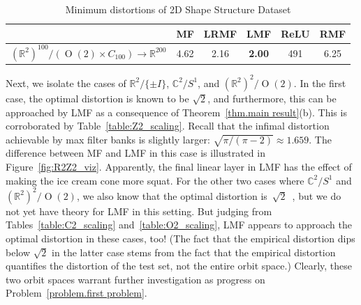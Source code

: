 \documentclass{article}
\theoremstyle{plain}
\theoremstyle{definition}
\begin{document}
{\begin{table}[p]
    \caption{Minimum distortions of 2D Shape Structure Dataset}
    \label{table:shapes_dist}
    \vspace{-6pt}
    \centering
    \begin{tabular}{|l||c|c|c|c||c|}
        \hline
        & \textbf{MF} & \textbf{LRMF} & \textbf{LMF} & \textbf{ReLU} & \textbf{RMF} \\
        \hline
        \textbf{$(\mathbb{R}^{2})^{100}/(\operatorname{O}(2) \times C_{100}) \to \mathbb{R}^{200}$} 
        & 4.62 & 2.16 & \textbf{2.00} & 491 & 6.25 \\
        \hline
    \end{tabular}
\end{table}

Next, we isolate the cases of $\mathbb{R}^2/\{\pm I\}$, $\mathbb{C}^2/S^1$, and $(\mathbb{R}^2)^2/\operatorname{O}(2)$.
In the first case, the optimal distortion is known to be $\sqrt{2}$, and furthermore, this can be approached by LMF as a consequence of Theorem~\ref{thm.main result}(b).
This is corroborated by Table~\ref{table:Z2_scaling}.
Recall that the infimal distortion achievable by max filter banks is slightly larger: $\sqrt{\pi/(\pi-2)}\approx 1.659$.
The difference between MF and LMF in this case is illustrated in Figure~\ref{fig:R2Z2_viz}.
Apparently, the final linear layer in LMF has the effect of making the ice cream cone more squat.
For the other two cases where $\mathbb{C}^2/S^1$ and $(\mathbb{R}^2)^2/\operatorname{O}(2)$, we also know that the optimal distortion is~$\sqrt{2}$~\cite{CahillIM:24,Blum-SmitEtal:25}, but we do not yet have theory for LMF in this setting.
But judging from Tables~\ref{table:C2_scaling} and~\ref{table:O2_scaling}, LMF appears to approach the optimal distortion in these cases, too!
(The fact that the empirical distortion dips below $\sqrt{2}$ in the latter case stems from the fact that the empirical distortion quantifies the distortion of the test set, not the entire orbit space.)
Clearly, these two orbit spaces warrant further investigation as progress on Problem~\ref{problem.first problem}.

\begin{figure}[t]
    \centering


\end{figure}}
\end{document}
